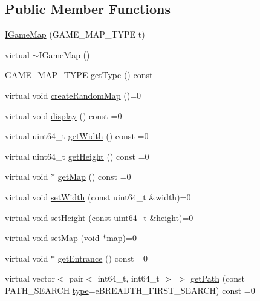 \subsection*{Public Member Functions}
\begin{DoxyCompactItemize}
\item 
\hyperlink{class_i_game_map_a5c0e405d6c0da614ad089ff5eb51a0ec}{I\+Game\+Map} (G\+A\+M\+E\+\_\+\+M\+A\+P\+\_\+\+T\+Y\+P\+E t)
\item 
virtual \hyperlink{class_i_game_map_a4570fe564ae81a672eac818b0ed5287e}{$\sim$\+I\+Game\+Map} ()
\item 
G\+A\+M\+E\+\_\+\+M\+A\+P\+\_\+\+T\+Y\+P\+E \hyperlink{class_i_game_map_ac12d3430f5df8beeab89d97b113058af}{get\+Type} () const 
\item 
virtual void \hyperlink{class_i_game_map_a611761470c396e89f98c7fe7d307dd6f}{create\+Random\+Map} ()=0
\item 
virtual void \hyperlink{class_i_game_map_acc38a0d85cfb39ee8167eeb2f92706eb}{display} () const  =0
\item 
virtual uint64\+\_\+t \hyperlink{class_i_game_map_a83e726799e1159ccc08a32267802299c}{get\+Width} () const  =0
\item 
virtual uint64\+\_\+t \hyperlink{class_i_game_map_a7adc098061e938548c3dc49510599dcb}{get\+Height} () const  =0
\item 
virtual void $\ast$ \hyperlink{class_i_game_map_af3cd6a615cb70c9f0072c650329bb40f}{get\+Map} () const  =0
\item 
virtual void \hyperlink{class_i_game_map_acf90d31ca830d07356ef4238243e392e}{set\+Width} (const uint64\+\_\+t \&width)=0
\item 
virtual void \hyperlink{class_i_game_map_a92ae9478169b2154c3bf47ff41ebcd8e}{set\+Height} (const uint64\+\_\+t \&height)=0
\item 
virtual void \hyperlink{class_i_game_map_aa0923e64ca5563724c471e11b8b9d397}{set\+Map} (void $\ast$map)=0
\item 
virtual void $\ast$ \hyperlink{class_i_game_map_ac24724d266d18fc6bb81b8e015c86dba}{get\+Entrance} () const  =0
\item 
virtual vector$<$ pair$<$ int64\+\_\+t, int64\+\_\+t $>$ $>$ \hyperlink{class_i_game_map_a1f5ed4f70b4bacfeac277842f335c2c1}{get\+Path} (const P\+A\+T\+H\+\_\+\+S\+E\+A\+R\+C\+H \hyperlink{class_i_game_map_a4b519e81c76f752f22f29959abb41684}{type}=e\+B\+R\+E\+A\+D\+T\+H\+\_\+\+F\+I\+R\+S\+T\+\_\+\+S\+E\+A\+R\+C\+H) const  =0
\end{DoxyCompactItemize}
